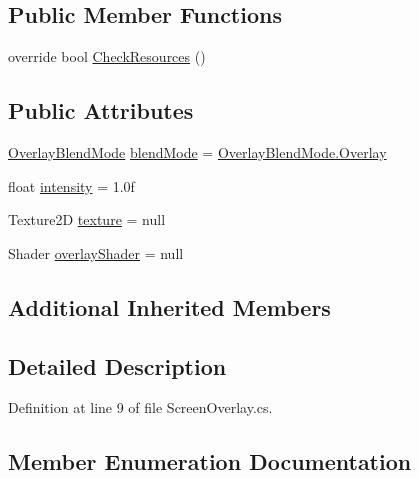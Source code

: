 \subsection*{Public Member Functions}
\begin{DoxyCompactItemize}
\item 
override bool \mbox{\hyperlink{class_unity_standard_assets_1_1_image_effects_1_1_screen_overlay_ad0235de5f915871090fa5789c43242a8}{Check\+Resources}} ()
\end{DoxyCompactItemize}
\subsection*{Public Attributes}
\begin{DoxyCompactItemize}
\item 
\mbox{\hyperlink{class_unity_standard_assets_1_1_image_effects_1_1_screen_overlay_a30569b65d427b6bed92c74463682cb00}{Overlay\+Blend\+Mode}} \mbox{\hyperlink{class_unity_standard_assets_1_1_image_effects_1_1_screen_overlay_a4b011caccdf62e51d74408722e9fcb78}{blend\+Mode}} = \mbox{\hyperlink{class_unity_standard_assets_1_1_image_effects_1_1_screen_overlay_a30569b65d427b6bed92c74463682cb00a6b551379c3c0b59326abdaf3b4395bd3}{Overlay\+Blend\+Mode.\+Overlay}}
\item 
float \mbox{\hyperlink{class_unity_standard_assets_1_1_image_effects_1_1_screen_overlay_a4a0a5bfcd436b7461f47ebf98acb3a04}{intensity}} = 1.\+0f
\item 
Texture2D \mbox{\hyperlink{class_unity_standard_assets_1_1_image_effects_1_1_screen_overlay_af6cbd5e2d8f6f08706eebca9d6536362}{texture}} = null
\item 
Shader \mbox{\hyperlink{class_unity_standard_assets_1_1_image_effects_1_1_screen_overlay_aad28704b47487353cf8d3b8a5e671d56}{overlay\+Shader}} = null
\end{DoxyCompactItemize}
\subsection*{Additional Inherited Members}


\subsection{Detailed Description}


Definition at line 9 of file Screen\+Overlay.\+cs.



\subsection{Member Enumeration Documentation}
\mbox{\label{class_unity_standard_assets_1_1_image_effects_1_1_screen_overlay_a30569b65d427b6bed92c74463682cb00}} 
